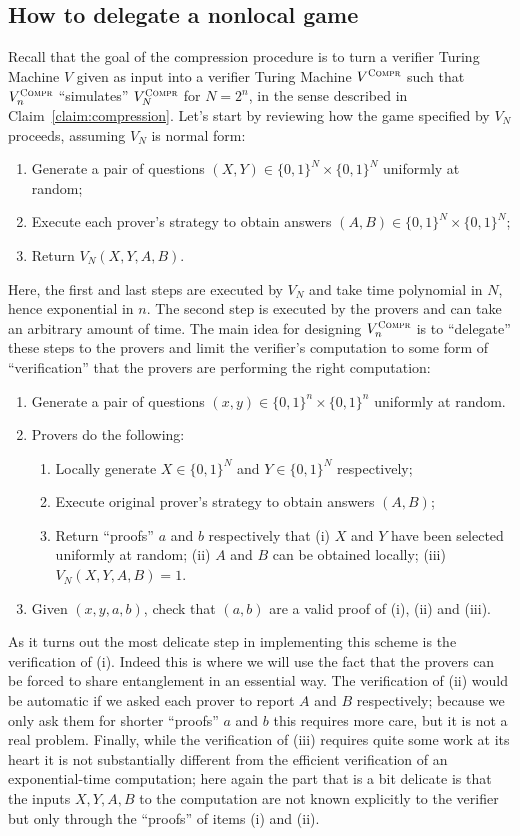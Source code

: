 \subsection{How to delegate a nonlocal game}

Recall that the goal of the compression procedure is to turn a  verifier Turing Machine $V$ given as input into a verifier Turing Machine $V^{\textsc{Compr}}$ such that $V^{\textsc{Compr}}_n$ ``simulates'' $V^{\textsc{Compr}}_N$ for $N=2^n$, in the sense described in Claim~\ref{claim:compression}. Let's start by reviewing how the game specified by $V_N$ proceeds, assuming $V_N$ is normal form:
\begin{enumerate}
\item Generate a pair of questions $(X,Y)\in \{0,1\}^N \times \{0,1\}^N$ uniformly at random;
\item Execute each prover's strategy to obtain answers $(A,B)\in\{0,1\}^N \times \{0,1\}^N $;
\item Return $V_N(X,Y,A,B)$.
\end{enumerate}
Here, the first and last steps are executed by $V_N$ and take time polynomial in $N$, hence exponential in $n$. The second step is executed by the provers and can take an arbitrary amount of time. The main idea for designing $V_n^{\textsc{Compr}}$ is to ``delegate'' these steps to the provers and limit the verifier's computation to some form of ``verification'' that the provers are performing the right computation: 
\begin{enumerate}
\item Generate a pair of questions $(x,y)\in \{0,1\}^n \times \{0,1\}^n$ uniformly at random.
\item Provers do the following:
\begin{enumerate}
\item Locally generate $X\in\{0,1\}^N$ and $Y\in \{0,1\}^N$ respectively;
\item Execute original prover's strategy to obtain answers $(A,B)$;
\item Return ``proofs'' $a$ and $b$ respectively that (i) $X$ and $Y$ have been selected uniformly at random; (ii) $A$ and $B$ can be obtained locally; (iii) $V_N(X,Y,A,B)=1$.
\end{enumerate}
\item Given $(x,y,a,b)$, check that $(a,b)$ are a valid proof of (i), (ii) and (iii). 
\end{enumerate}
As it turns out the most delicate step in implementing this scheme is the verification of (i). Indeed this is where we will use the fact that the provers can be forced to share entanglement in an essential way. The verification of (ii) would be automatic if we asked each prover to report $A$ and $B$ respectively; because we only ask them for shorter ``proofs'' $a$ and $b$ this requires more care, but it is not a real problem. Finally, while the verification of (iii) requires quite some work at its heart it is not substantially different from the efficient verification of an exponential-time computation; here again the part that is a bit delicate is that the inputs $X,Y,A,B$ to the computation are not known explicitly to the verifier but only through the ``proofs'' of items (i) and (ii). 

